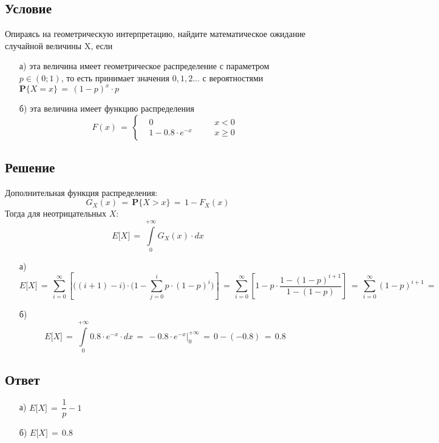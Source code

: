 \documentclass{article}
\begin{document}
\subsection*{Условие}
Опираясь на геометрическую интерпретацию, найдите математическое ожидание случайной величины X, если
\begin{enumerate}
\item[а)] эта величина имеет геометрическое распределение с параметром $ p \! \in \! (0;1) $, то есть принимает значения $ 0,1,2... $ с вероятностями $ \mathbf{P} \big\{ X \! = \! x \big\} \, = \, {(1 \! - \! p)}^x \! \cdot \! p $
\item[б)] эта величина имеет функцию распределения
\begin{equation*}
F(x) \, = \,
\left\{
\begin{aligned}
& 0 & & \quad x \! < \! 0 \\
& 1 \! - \! 0.8 \! \cdot \! e^{-x} & & \quad x \! \geqslant \! 0
\end{aligned}
\right.
\end{equation*}
\end{enumerate}
\subsection*{Решение}
Дополнительная функция распределения:
\[ G_X(x) \, = \, \mathbf{P} \big\{ X \! > \! x \big\} \, = \, 1 \! - \! F_X(x) \]
Тогда для неотрицательных $ X $:
\[ E \big[ X \big] \, = \, \int\limits_0^{+\infty} G_X(x) \! \cdot \! dx \]
\begin{enumerate}
\item[а)]
\[ E \big[ X \big] \, = \, \sum\limits_{i=0}^\infty \left[ \Big( (i \! + \! 1) \! - \! i \Big) \! \cdot \! \bigg( 1 \! - \! \sum\limits_{j=0}^i p \! \cdot \! (1 \! - \! p)^{i} \bigg) \right] \, = \, \sum_{i=0}^\infty \left[ 1 \! - \! p \! \cdot \! \dfrac{1 \! - \! (1 \! - \! p)^{i+1}}{1 \! - \! (1 \! - \! p)} \right] \, = \, \sum\limits_{i=0}^\infty (1 \! - \! p)^{i+1} \, = \]
\item[б)]
\[ E \big[ X \big] \, = \, \int\limits_0^{+\infty} 0.8 \! \cdot \! e^{-x} \! \cdot \! dx \, = \, -0.8 \! \cdot \! e^{-x} \Big|_0^{+\infty} \, = \, 0 \! - \! (-0.8) \, = \, 0.8 \]
\end{enumerate}
\subsection*{Ответ}
\begin{enumerate}
\item[а)] $ E \big[ X \big] \, = \, \dfrac{1}{p} \! - \! 1 $
\item[б)] $ E \big[ X \big] \, = \, 0.8 $
\end{enumerate}
\end{document}
